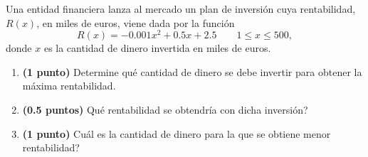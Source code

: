 
Una entidad financiera lanza al mercado un plan de inversión cuya rentabilidad, $R(x)$, en miles de euros, viene dada por la función
\[
R(x)=-0.001x^2+0.5x+2.5\qquad1\leq x\leq500,
\]
donde $x$ es la cantidad de dinero invertida en miles de euros.
\begin{enumerate}[label=\alph*)]
\item \textbf{(1 punto)} Determine qué cantidad de dinero se debe invertir para obtener la máxima rentabilidad.
\item \textbf{(0.5 puntos)} \textquestiondown{}Qué rentabilidad se obtendría con dicha inversión?
\item \textbf{(1 punto)} \textquestiondown{}Cuál es la cantidad de dinero para la que se obtiene menor rentabilidad?
\end{enumerate}
